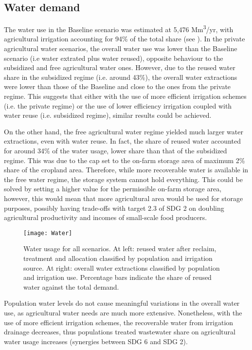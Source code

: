 \subsection{Water demand}
The water use in the Baseline scenario was estimated at 5,476 Mm\textsuperscript{3}/yr, with agricultural irrigation accounting for 94\% of the total share (see ). In the private agricultural water scenarios, the overall water use was lower than the Baseline scenario (i.e water extrated plus water reused), opposite behaviour to the subsidized and free agricultural water ones. However, due to the reused water share in the subsidized regime (i.e. around 43\%), the overall water extractions were lower than those of the Baseline and close to the ones from the private regime. This suggests that either with the use of more efficient irrigation schemes (i.e. the private regime) or the use of lower efficiency irrigation coupled with water reuse (i.e. subsidized regime), similar results could be achieved.

On the other hand, the free agricultural water regime yielded much larger water extractions, even with water reuse. In fact, the share of reused water accounted for around 34\% of the water usage, lower share than that of the subsidized regime. This was due to the cap set to the on-farm storage area of maximum 2\% share of the cropland area. Therefore, while more recoverable water is available in the free water regime, the storage system cannot hold everything. This could be solved by setting a higher value for the permissible on-farm storage area, however, this would mean that more agricultural area would be used for storage purposes, possibly having trade-offs with target 2.3 of SDG 2 on doubling agricultural productivity and incomes of small-scale food producers.

\begin{figure*}[!t]
	\centering
	\texttt{[image: Water]}
	\caption{Water usage for all scenarios. At left: reused water after reclaim, treatment and allocation classified by population and irrigation source. At right: overall water extractions classified by population and irrigation use. Percentage bars indicate the share of reused water against the total demand.}
	\label{fig:water}
\end{figure*}

Population water levels do not cause meaningful variations in the overall water use, as agricultural water needs are much more extensive. Nonetheless, with the use of more efficient irrigation schemes, the recoverable water from irrigation drainage decreases, thus populations treated wastewater share on agricultural water usage increases (synergies between SDG 6 and SDG 2).

